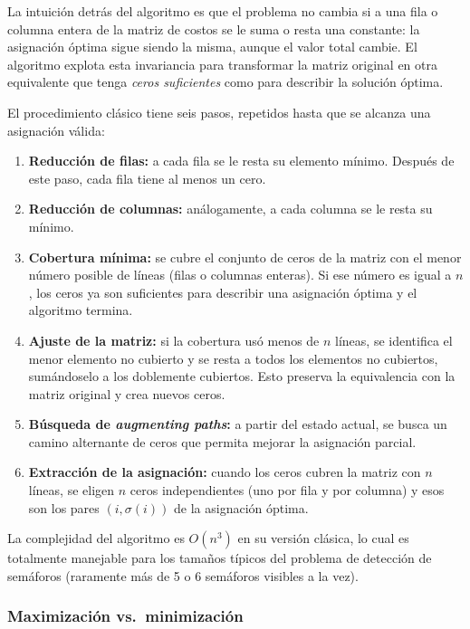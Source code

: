 La intuición detrás del algoritmo es que el problema no cambia si a una fila o columna entera de la matriz de costos se le suma o resta una constante: la asignación óptima sigue siendo la misma, aunque el valor total cambie. El algoritmo explota esta invariancia para transformar la matriz original en otra equivalente que tenga \textit{ceros suficientes} como para describir la solución óptima.

El procedimiento clásico tiene seis pasos, repetidos hasta que se alcanza una asignación válida:

\begin{enumerate}
    \item \textbf{Reducción de filas:} a cada fila se le resta su elemento mínimo. Después de este paso, cada fila tiene al menos un cero.
    \item \textbf{Reducción de columnas:} análogamente, a cada columna se le resta su mínimo.
    \item \textbf{Cobertura mínima:} se cubre el conjunto de ceros de la matriz con el menor número posible de líneas (filas o columnas enteras). Si ese número es igual a $n$, los ceros ya son suficientes para describir una asignación óptima y el algoritmo termina.
    \item \textbf{Ajuste de la matriz:} si la cobertura usó menos de $n$ líneas, se identifica el menor elemento no cubierto y se resta a todos los elementos no cubiertos, sumándoselo a los doblemente cubiertos. Esto preserva la equivalencia con la matriz original y crea nuevos ceros.
    \item \textbf{Búsqueda de \textit{augmenting paths}:} a partir del estado actual, se busca un camino alternante de ceros que permita mejorar la asignación parcial.
    \item \textbf{Extracción de la asignación:} cuando los ceros cubren la matriz con $n$ líneas, se eligen $n$ ceros independientes (uno por fila y por columna) y esos son los pares $(i, \sigma(i))$ de la asignación óptima.
\end{enumerate}

La complejidad del algoritmo es $O(n^3)$ en su versión clásica, lo cual es totalmente manejable para los tamaños típicos del problema de detección de semáforos (raramente más de 5 o 6 semáforos visibles a la vez).

\subsubsection{Maximización vs.\ minimización}

